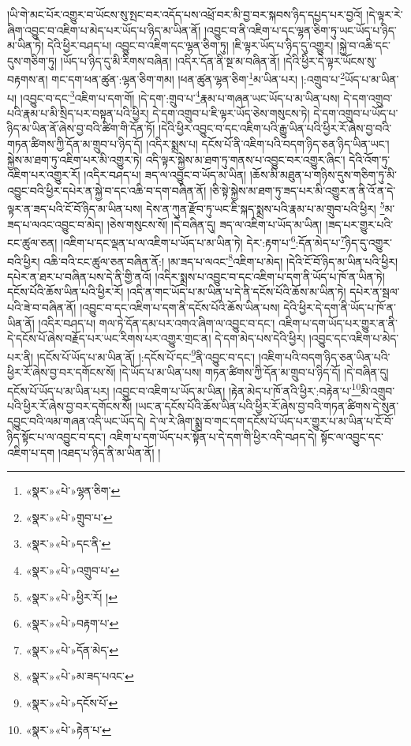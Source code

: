 །ཡི་གེ་མང་པོར་འགྱུར་བ་ཡོངས་སུ་སྤང་བར་འདོད་པས་འཕྲོ་བར་མི་བྱ་བར་སྐབས་ཉིད་དཔྱད་པར་བྱའོ། །དེ་ལྟར་རེ་ཞིག་འབྱུང་བ་འཇིག་པ་མེད་པར་ཡོད་པ་ཉིད་མ་ཡིན་ནོ། །འབྱུང་བ་ནི་འཇིག་པ་དང་ལྷན་ཅིག་ཏུ་ཡང་ཡོད་པ་ཉིད་མ་ཡིན་ཏེ། དེའི་ཕྱིར་བཤད་པ། འབྱུང་བ་འཇིག་དང་ལྷན་ཅིག་ཏུ། །ཇི་ལྟར་ཡོད་པ་ཉིད་དུ་འགྱུར། །སྐྱེ་བ་འཆི་དང་དུས་གཅིག་ཏུ། །ཡོད་པ་ཉིད་དུ་མི་རིགས་བཞིན། །འདིར་དོན་ནི་སྔ་མ་བཞིན་ནོ། །དེའི་ཕྱིར་དེ་ལྟར་ཡོངས་སུ་བརྟགས་ན། གང་དག་ཕན་ཚུན་:ལྷན་ཅིག་གམ། །ཕན་ཚུན་ལྷན་ཅིག་\footnote{«སྣར་»«པེ་»ལྷན་ཅིག་}མ་ཡིན་པར། །:འགྲུབ་པ་\footnote{«སྣར་»«པེ་»གྲུབ་པ་}ཡོད་པ་མ་ཡིན་པ། །འབྱུང་བ་དང་\footnote{«སྣར་»«པེ་»དང་ནི་}འཇིག་པ་དག་གོ། །དེ་དག་:གྲུབ་པ་\footnote{«སྣར་»«པེ་»འགྲུབ་པ་}རྣམ་པ་གཞན་ཡང་ཡོད་པ་མ་ཡིན་པས། དེ་དག་འགྲུབ་པའི་རྣམ་པ་མི་སྲིད་པར་བསྟན་པའི་ཕྱིར། དེ་དག་འགྲུབ་པ་ཇི་ལྟར་ཡོད་ཅེས་གསུངས་ཏེ། དེ་དག་འགྲུབ་པ་ཡོད་པ་ཉིད་མ་ཡིན་ནོ་ཞེས་བྱ་བའི་ཚིག་གི་དོན་ཏོ། །དེའི་ཕྱིར་འབྱུང་བ་དང་འཇིག་པའི་རྒྱུ་ཡིན་པའི་ཕྱིར་རོ་ཞེས་བྱ་བའི་གཏན་ཚིགས་ཀྱི་དོན་མ་གྲུབ་པ་ཉིད་དོ། །འདིར་སྨྲས་པ། དངོས་པོ་ནི་འཇིག་པའི་བདག་ཉིད་ཅན་ཉིད་ཡིན་ཡང་། སྐྱེས་མ་ཐག་ཏུ་འཇིག་པར་མི་འགྱུར་ཏེ། འདི་ལྟར་སྐྱེས་མ་ཐག་ཏུ་གནས་པ་འབྱུང་བར་འགྱུར་ཞིང་། དེའི་འོག་ཏུ་འཇིག་པར་འགྱུར་རོ། །འདིར་བཤད་པ། ཟད་ལ་འབྱུང་བ་ཡོད་མ་ཡིན། །ཆོས་མི་མཐུན་པ་གཉིས་དུས་གཅིག་ཏུ་མི་འབྱུང་བའི་ཕྱིར་དཔེར་ན་སྐྱེ་བ་དང་འཆི་བ་དག་བཞིན་ནོ། །ཅི་སྟེ་སྐྱེས་མ་ཐག་ཏུ་ཟད་པར་མི་འགྱུར་ན་ནི་འོ་ན་དེ་ལྟར་ན་ཟད་པའི་ངོ་བོ་ཉིད་མ་ཡིན་པས། དེས་ན་ཀུན་རྫོབ་ཏུ་ཡང་ཇི་སྐད་སྨྲས་པའི་རྣམ་པ་མ་གྲུབ་པའི་ཕྱིར། \footnote{«སྣར་»«པེ་»ཕྱིར་རོ། ། }མ་ཟད་པ་ལའང་འབྱུང་བ་མེད། །ཅེས་གསུངས་སོ། །དེ་བཞིན་དུ། ཟད་ལ་འཇིག་པ་ཡོད་མ་ཡིན། །ཟད་པར་གྱུར་པའི་ངང་ཚུལ་ཅན། །འཇིག་པ་དང་ལྡན་པ་ལ་འཇིག་པ་ཡོད་པ་མ་ཡིན་ཏེ། དེར་:རྟག་པ་\footnote{«སྣར་»«པེ་»བརྟག་པ་}:དོན་མེད་པ་\footnote{«སྣར་»«པེ་»དོན་མེད་}ཉིད་དུ་འགྱུར་བའི་ཕྱིར། འཆི་བའི་ངང་ཚུལ་ཅན་བཞིན་ནོ:། །མ་ཟད་པ་ལའང་\footnote{«སྣར་»«པེ་»མ་ཟད་པའང་}འཇིག་པ་མེད། །དེའི་ངོ་བོ་ཉིད་མ་ཡིན་པའི་ཕྱིར། དཔེར་ན་ཐར་པ་བཞིན་པས་དེ་ནི་གྱི་ནའོ། །འདིར་སྨྲས་པ་འབྱུང་བ་དང་འཇིག་པ་དག་ནི་ཡོད་པ་ཁོ་ན་ཡིན་ཏེ། དངོས་པོའི་ཆོས་ཡིན་པའི་ཕྱིར་རོ། །འདི་ན་གང་ཡོད་པ་མ་ཡིན་པ་དེ་ནི་དངོས་པོའི་ཆོས་མ་ཡིན་ཏེ། དཔེར་ན་སྦལ་པའི་ཟེ་བ་བཞིན་ནོ། །འབྱུང་བ་དང་འཇིག་པ་དག་ནི་དངོས་པོའི་ཆོས་ཡིན་པས། དེའི་ཕྱིར་དེ་དག་ནི་ཡོད་པ་ཁོ་ན་ཡིན་ནོ། །འདིར་བཤད་པ། གལ་ཏེ་དོན་དམ་པར་འགའ་ཞིག་ལ་འབྱུང་བ་དང་། འཇིག་པ་དག་ཡོད་པར་གྱུར་ན་ནི་དེ་དངོས་པོ་ཞེས་བརྗོད་པར་ཡང་རིགས་པར་འགྱུར་གྲང་ན། དེ་དག་མེད་པས་དེའི་ཕྱིར། །འབྱུང་དང་འཇིག་པ་མེད་པར་ནི། །དངོས་པོ་ཡོད་པ་མ་ཡིན་ནོ། །:དངོས་པོ་དང་\footnote{«སྣར་»«པེ་»དངོས་པོ་}ནི་འབྱུང་བ་དང་། །འཇིག་པའི་བདག་ཉིད་ཅན་ཡིན་པའི་ཕྱིར་རོ་ཞེས་བྱ་བར་དགོངས་སོ། །དེ་ཡོད་པ་མ་ཡིན་པས། གཏན་ཚིགས་ཀྱི་དོན་མ་གྲུབ་པ་ཉིད་དོ། །དེ་བཞིན་དུ། དངོས་པོ་ཡོད་པ་མ་ཡིན་པར། །འབྱུང་བ་འཇིག་པ་ཡོད་མ་ཡིན། །རྟེན་མེད་པ་ཁོ་ནའི་ཕྱིར་:བརྟེན་པ་\footnote{«སྣར་»«པེ་»རྟེན་པ་}མི་འགྲུབ་པའི་ཕྱིར་རོ་ཞེས་བྱ་བར་དགོངས་སོ། །ཡང་ན་དངོས་པོའི་ཆོས་ཡིན་པའི་ཕྱིར་རོ་ཞེས་བྱ་བའི་གཏན་ཚིགས་དེ་སུན་དབྱུང་བའི་ལམ་གཞན་འདི་ཡང་ཡོད་དེ། དེ་ལ་རེ་ཞིག་སྨྲ་བ་གང་དག་དངོས་པོ་ཡོད་པར་གྱུར་པ་མ་ཡིན་པ་ངོ་བོ་ཉིད་སྟོང་པ་ལ་འབྱུང་བ་དང་། འཇིག་པ་དག་ཡོད་པར་སྟོན་པ་དེ་དག་གི་ཕྱིར་འདི་བཤད་དེ། སྟོང་ལ་འབྱུང་དང་འཇིག་པ་དག །འཐད་པ་ཉིད་ནི་མ་ཡིན་ནོ། །
